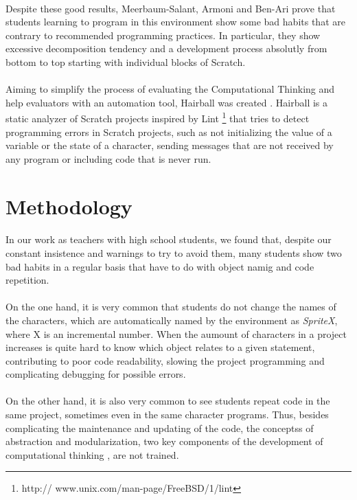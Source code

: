 \documentclass[a4paper,10pt]{article}
\begin{document}
\paragraph{}Despite these good results, Meerbaum-Salant, Armoni and Ben-Ari \cite{meerbaum2011habits} prove that students learning to program in this environment show some bad habits that are contrary to recommended programming practices. In particular, they show excessive decomposition tendency and a development process absolutly from bottom to top starting with individual blocks of Scratch.
\paragraph{} Aiming to simplify the process of evaluating the Computational Thinking and help evaluators with an automation tool, Hairball was created \cite{boe2013hairball}. Hairball is a static analyzer of Scratch projects inspired by Lint \footnote{http:// www.unix.com/man-page/FreeBSD/1/lint} that tries to detect programming errors in Scratch projects, such as not initializing the value of a variable or the state of a character, sending messages that are not received by any program or including code that is never run.

\section{Methodology}

\paragraph{}In our work as teachers with high school students, we found that, despite our constant insistence and warnings to try to avoid them, many students show two bad habits in a regular basis that have to do with object namig and code repetition.

\paragraph{}On the one hand, it is very common that students do not change the names of the characters, which are automatically named by the environment as \textit{SpriteX}, where X is an incremental number. When the aumount of characters in a project increases is quite hard to know which object relates to a given statement, contributing to poor code readability, slowing the project programming and complicating debugging for possible errors.
\paragraph{}On the other hand, it is also very common to see students repeat code in the same project, sometimes even in the same character programs. Thus, besides complicating the maintenance and updating of the code, the conceptss of abstraction and modularization, two key components of the development of computational thinking \cite{wing2008computational}, are not trained.
\end{document}
